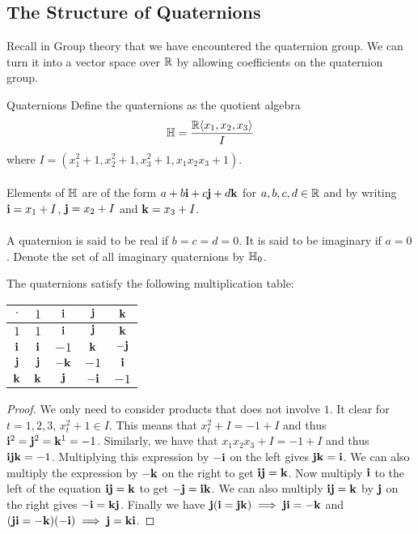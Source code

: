 \documentclass[a4paper]{article}
\begin{document}
\subsection{The Structure of Quaternions}
Recall in Group theory that we have encountered the quaternion group. We can turn it into a vector space over $\mathbb{R}$ by allowing coefficients on the quaternion group. 

\begin{defn}{Quaternions}{} Define the quaternions as the quotient algebra $$\mathbb{H}=\frac{\mathbb{R}\langle x_1,x_2,x_3\rangle}{I}$$ where $I=(x_1^2+1,x_2^2+1,x_3^2+1,x_1x_2x_3+1)$. \\~\\
Elements of $\mathbb{H}$ are of the form $a+b\vb{i}+c\vb{j}+d\vb{k}$ for $a,b,c,d\in\mathbb{R}$ and by writing $\vb{i}=x_1+I$, $\vb{j}=x_2+I$ and $\vb{k}=x_3+I$. \\~\\
A quaternion is said to be real if $b=c=d=0$. It is said to be imaginary if $a=0$. Denote the set of all imaginary quaternions by $\mathbb{H}_0$. 
\end{defn}

\begin{prp}{}{} The quaternions satisfy the following multiplication table: \begin{center}
\begin{tabular}{ |c|c|c|c|c| } 
\hline
$\cdot$ & $1$ & $\vb{i}$ & $\vb{j}$ & $\vb{k}$\\\hline
$1$ & $1$ & $\vb{i}$ & $\vb{j}$ & $\vb{k}$\\\hline
$\vb{i}$ & $\vb{i}$ & $-1$& $\vb{k}$ & $-\vb{j}$ \\\hline
$\vb{j}$ & $\vb{j}$& $-\vb{k}$& $-1$& $\vb{i}$\\\hline
$\vb{k}$ & $\vb{k}$ & $\vb{j}$ & $-\vb{i}$ & $-1$\\\hline
\end{tabular}
\end{center}\tcbline
\begin{proof}
We only need to consider products that does not involve $1$. It clear for $t=1,2,3$, $x_t^2+1\in I$. This means that $x_t^2+I=-1+I$ and thus $\vb{i}^2=\vb{j}^2=\vb{k}^1=-1$. Similarly, we have that $x_1x_2x_3+I=-1+I$ and thus $\vb{ijk}=-1$. Multiplying this expression by $-\vb{i}$ on the left gives $\vb{jk}=\vb{i}$. We can also multiply the expression by $-\vb{k}$ on the right to get $\vb{ij}=\vb{k}$. Now multiply $\vb{i}$ to the left of the equation $\vb{ij}=\vb{k}$ to get $-\vb{j}=\vb{ik}$. We can also multiply $\vb{ij}=\vb{k}$ by $\vb{j}$ on the right gives $-\vb{i}=\vb{kj}$. Finally we have $\vb{j}(\vb{i}=\vb{jk})\implies\vb{ji}=-\vb{k}$ and $(\vb{ji}=-\vb{k})(-\vb{i})\implies\vb{j}=\vb{ki}$. 
\end{proof}
\end{prp}
\end{document}
